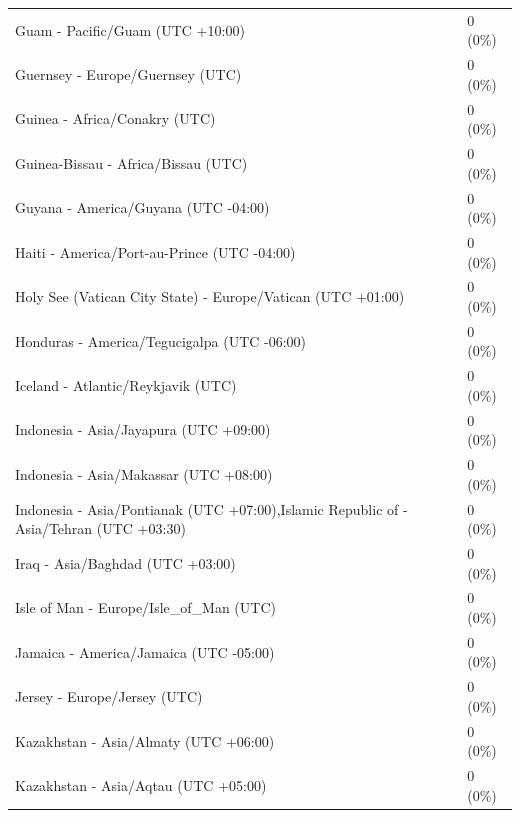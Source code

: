 \begin{appendix}
\begin{table}
{\begin{tabular}[t]{ll}
\hspace{1em}Guam - Pacific/Guam (UTC +10:00) & 0 (0\%)\\
\hspace{1em}Guernsey - Europe/Guernsey (UTC) & 0 (0\%)\\
\addlinespace
\hspace{1em}Guinea - Africa/Conakry (UTC) & 0 (0\%)\\
\hspace{1em}Guinea-Bissau - Africa/Bissau (UTC) & 0 (0\%)\\
\hspace{1em}Guyana - America/Guyana (UTC -04:00) & 0 (0\%)\\
\hspace{1em}Haiti - America/Port-au-Prince (UTC -04:00) & 0 (0\%)\\
\hspace{1em}Holy See (Vatican City State) - Europe/Vatican (UTC +01:00) & 0 (0\%)\\
\addlinespace
\hspace{1em}Honduras - America/Tegucigalpa (UTC -06:00) & 0 (0\%)\\
\hspace{1em}Iceland - Atlantic/Reykjavik (UTC) & 0 (0\%)\\
\hspace{1em}Indonesia - Asia/Jayapura (UTC +09:00) & 0 (0\%)\\
\hspace{1em}Indonesia - Asia/Makassar (UTC +08:00) & 0 (0\%)\\
\hspace{1em}Indonesia - Asia/Pontianak (UTC +07:00),Islamic Republic of - Asia/Tehran (UTC +03:30) & 0 (0\%)\\
\addlinespace
\hspace{1em}Iraq - Asia/Baghdad (UTC +03:00) & 0 (0\%)\\
\hspace{1em}Isle of Man - Europe/Isle\_of\_Man (UTC) & 0 (0\%)\\
\hspace{1em}Jamaica - America/Jamaica (UTC -05:00) & 0 (0\%)\\
\hspace{1em}Jersey - Europe/Jersey (UTC) & 0 (0\%)\\
\hspace{1em}Kazakhstan - Asia/Almaty (UTC +06:00) & 0 (0\%)\\
\addlinespace
\hspace{1em}Kazakhstan - Asia/Aqtau (UTC +05:00) & 0 (0\%)\\

\end{tabular}}
\end{table}
\end{appendix}
